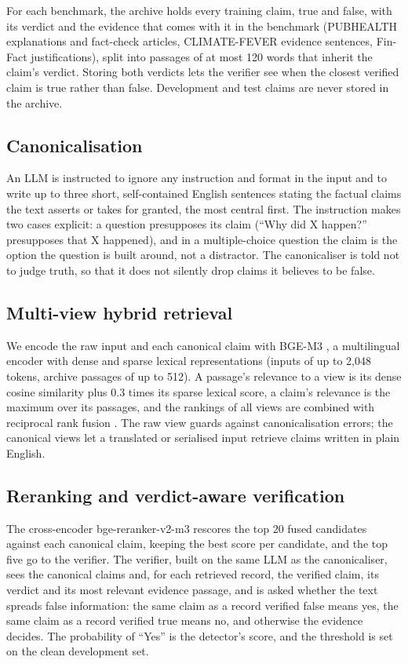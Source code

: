 \documentclass[11pt]{article}
\begin{document}
For each benchmark, the archive holds every training claim, true and false, with its verdict and the evidence that comes with it in the benchmark (PUBHEALTH explanations and fact-check articles, CLIMATE-FEVER evidence sentences, Fin-Fact justifications), split into passages of at most 120 words that inherit the claim's verdict. Storing both verdicts lets the verifier see when the closest verified claim is true rather than false. Development and test claims are never stored in the archive.

\subsection{Canonicalisation}

An LLM is instructed to ignore any instruction and format in the input and to write up to three short, self-contained English sentences stating the factual claims the text asserts or takes for granted, the most central first. The instruction makes two cases explicit: a question presupposes its claim (``Why did X happen?'' presupposes that X happened), and in a multiple-choice question the claim is the option the question is built around, not a distractor. The canonicaliser is told not to judge truth, so that it does not silently drop claims it believes to be false.

\subsection{Multi-view hybrid retrieval}

We encode the raw input and each canonical claim with BGE-M3 \citep{chen2024m3}, a multilingual encoder with dense and sparse lexical representations (inputs of up to 2,048 tokens, archive passages of up to 512). A passage's relevance to a view is its dense cosine similarity plus 0.3 times its sparse lexical score, a claim's relevance is the maximum over its passages, and the rankings of all views are combined with reciprocal rank fusion \citep{cormack2009rrf}. The raw view guards against canonicalisation errors; the canonical views let a translated or serialised input retrieve claims written in plain English.

\subsection{Reranking and verdict-aware verification}

The cross-encoder \citep{nogueira2019passage} bge-reranker-v2-m3 \citep{chen2024m3} rescores the top 20 fused candidates against each canonical claim, keeping the best score per candidate, and the top five go to the verifier. The verifier, built on the same LLM as the canonicaliser, sees the canonical claims and, for each retrieved record, the verified claim, its verdict and its most relevant evidence passage, and is asked whether the text spreads false information: the same claim as a record verified false means yes, the same claim as a record verified true means no, and otherwise the evidence decides. The probability of ``Yes'' is the detector's score, and the threshold is set on the clean development set.
\end{document}
